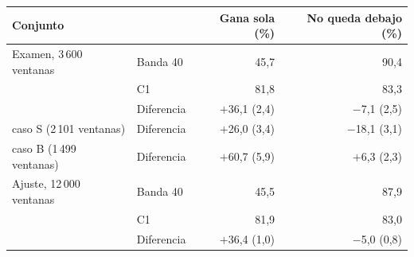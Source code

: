 \begin{tabular}{llrr}
\toprule
Conjunto &  & Gana sola (\%) & No queda debajo (\%) \\
\midrule
Examen, 3\,600 ventanas & Banda 40 & 45{,}7 & 90{,}4 \\
 & C1 & 81{,}8 & 83{,}3 \\
 & Diferencia & $+$36{,}1 (2{,}4) & $-$7{,}1 (2{,}5) \\
\quad caso S (2\,101 ventanas) & Diferencia & $+$26{,}0 (3{,}4) & $-$18{,}1 (3{,}1) \\
\quad caso B (1\,499 ventanas) & Diferencia & $+$60{,}7 (5{,}9) & $+$6{,}3 (2{,}3) \\
\midrule
Ajuste, 12\,000 ventanas & Banda 40 & 45{,}5 & 87{,}9 \\
 & C1 & 81{,}9 & 83{,}0 \\
 & Diferencia & $+$36{,}4 (1{,}0) & $-$5{,}0 (0{,}8) \\
\bottomrule
\end{tabular}
\par{}
